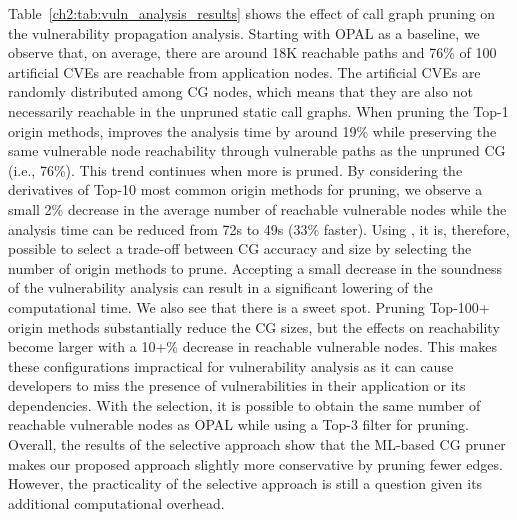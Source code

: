 Table~\ref{ch2:tab:vuln_analysis_results} shows the effect of call graph pruning on the vulnerability propagation analysis. Starting with OPAL as a baseline, we observe that, on average, there are around 18K reachable paths and 76\% of 100 artificial CVEs are reachable from application nodes.
The artificial CVEs are randomly distributed among CG nodes, which means that they are also not necessarily reachable in the unpruned static call graphs.
When pruning the Top-1 origin methods,  improves the analysis time by around 19\% while preserving the same vulnerable node reachability through vulnerable paths as the unpruned CG (i.e., 76\%).
This trend continues when more is pruned.
By considering the derivatives of Top-10 most common origin methods for pruning, we observe a small 2\% decrease in the average number of reachable vulnerable nodes while the analysis time can be reduced from 72s to 49s (33\% faster).
Using , it is, therefore, possible to select a trade-off between CG accuracy and size by selecting the number of origin methods to prune. Accepting a small decrease in the soundness of the vulnerability analysis can result in a significant lowering of the computational time.
We also see that there is a sweet spot.
Pruning Top-100+ origin methods substantially reduce the CG sizes, but the effects on reachability become larger with a 10+\% decrease in reachable vulnerable nodes. This makes these configurations impractical for vulnerability analysis as it can cause developers to miss the presence of vulnerabilities in their application or its dependencies.
With the selection, it is possible to obtain the same number of reachable vulnerable nodes as OPAL while using a Top-3 filter for pruning. Overall, the results of the selective approach show that the ML-based CG pruner makes our proposed approach slightly more conservative by pruning fewer edges. However, the practicality of the selective approach is still a question given its additional computational overhead.

